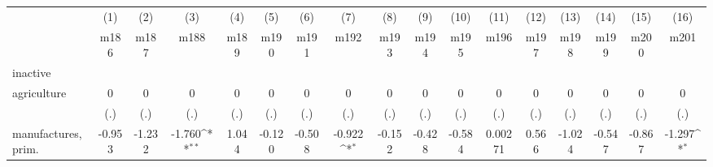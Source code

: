 {
\def\sym#1{\ifmmode^{#1}\else\(^{#1}\)\fi}
\begin{tabular}{l*{16}{c}}
\hline\hline
                    &\multicolumn{1}{c}{(1)}&\multicolumn{1}{c}{(2)}&\multicolumn{1}{c}{(3)}&\multicolumn{1}{c}{(4)}&\multicolumn{1}{c}{(5)}&\multicolumn{1}{c}{(6)}&\multicolumn{1}{c}{(7)}&\multicolumn{1}{c}{(8)}&\multicolumn{1}{c}{(9)}&\multicolumn{1}{c}{(10)}&\multicolumn{1}{c}{(11)}&\multicolumn{1}{c}{(12)}&\multicolumn{1}{c}{(13)}&\multicolumn{1}{c}{(14)}&\multicolumn{1}{c}{(15)}&\multicolumn{1}{c}{(16)}\\
                    &\multicolumn{1}{c}{m186}&\multicolumn{1}{c}{m187}&\multicolumn{1}{c}{m188}&\multicolumn{1}{c}{m189}&\multicolumn{1}{c}{m190}&\multicolumn{1}{c}{m191}&\multicolumn{1}{c}{m192}&\multicolumn{1}{c}{m193}&\multicolumn{1}{c}{m194}&\multicolumn{1}{c}{m195}&\multicolumn{1}{c}{m196}&\multicolumn{1}{c}{m197}&\multicolumn{1}{c}{m198}&\multicolumn{1}{c}{m199}&\multicolumn{1}{c}{m200}&\multicolumn{1}{c}{m201}\\
\hline
inactive            &                     &                     &                     &                     &                     &                     &                     &                     &                     &                     &                     &                     &                     &                     &                     &                     \\
agriculture         &           0         &           0         &           0         &           0         &           0         &           0         &           0         &           0         &           0         &           0         &           0         &           0         &           0         &           0         &           0         &           0         \\
                    &         (.)         &         (.)         &         (.)         &         (.)         &         (.)         &         (.)         &         (.)         &         (.)         &         (.)         &         (.)         &         (.)         &         (.)         &         (.)         &         (.)         &         (.)         &         (.)         \\
[1em]
manufactures, prim. &      -0.953         &      -1.232         &      -1.760\sym{**} &       1.044         &      -0.120         &      -0.508         &      -0.922\sym{*}  &      -0.152         &      -0.428         &      -0.584         &     0.00271         &       0.566         &      -1.024         &      -0.547         &      -0.867         &      -1.297\sym{*}  \\

\end{tabular}}
